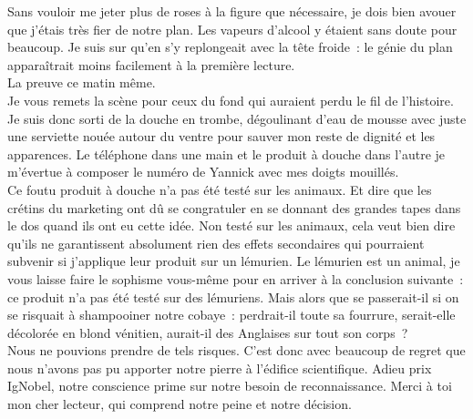 Sans vouloir me jeter plus de roses à la figure que nécessaire, je dois bien avouer que j’étais très fier de notre plan. Les vapeurs d’alcool y étaient sans doute pour beaucoup. Je suis sur qu’en s’y replongeait avec la tête froide : le génie du plan apparaîtrait moins facilement à la première lecture. \\
La preuve ce matin même.\\

Je vous remets la scène pour ceux du fond qui auraient perdu le fil de l’histoire. Je suis donc sorti de la douche en trombe, dégoulinant d’eau de mousse avec juste une serviette nouée autour du ventre pour sauver mon reste de dignité et les apparences. Le téléphone dans une main et le produit à douche dans l’autre je m’évertue à composer le numéro de Yannick avec mes doigts mouillés. \\
Ce foutu produit à douche n’a pas été testé sur les animaux. Et dire que les crétins du marketing ont dû se congratuler en se donnant des grandes tapes dans le dos quand ils ont eu cette idée. Non testé sur les animaux, cela veut bien dire qu’ils ne garantissent absolument rien des effets secondaires qui pourraient subvenir si j’applique leur produit sur un lémurien. Le lémurien est un animal, je vous laisse faire le sophisme vous-même pour en arriver à la conclusion suivante : ce produit n’a pas été testé sur des lémuriens. Mais alors que se passerait-il si on se risquait à shampooiner notre cobaye : perdrait-il toute sa fourrure, serait-elle décolorée en blond vénitien, aurait-il des Anglaises sur tout son corps ? \\
Nous ne pouvions prendre de tels risques. C’est donc avec beaucoup de regret que nous n’avons pas pu apporter notre pierre à l’édifice scientifique. Adieu prix IgNobel, notre conscience prime sur notre besoin de reconnaissance. Merci à toi mon cher lecteur, qui comprend notre peine et notre décision.

